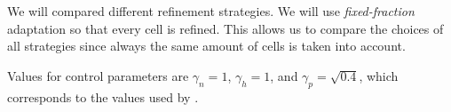 We will compared different refinement strategies. We will use \textit{fixed-fraction} adaptation so that every cell is refined. This allows us to compare the choices of all strategies since always the same amount of cells is taken into account. 

Values for control parameters are $\gamma_n = 1$, $\gamma_h = 1$, and $\gamma_p = \sqrt{0.4}$, which corresponds to the values used by \textcites{melenk2001}{mitchell2014}.




